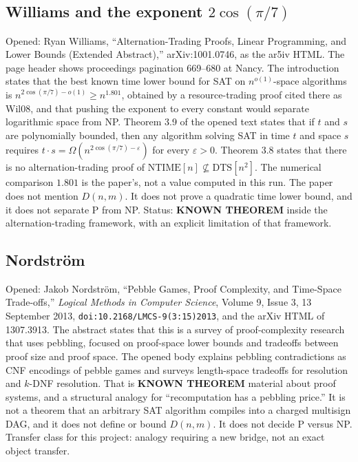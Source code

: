 \documentclass[11pt]{article}
\begin{document}
\subsection*{Williams and the exponent \(2\cos(\pi/7)\)}
Opened: Ryan Williams, ``Alternation-Trading Proofs, Linear Programming, and Lower Bounds (Extended Abstract),'' arXiv:1001.0746, as the ar5iv HTML.
The page header shows proceedings pagination 669--680 at Nancy.
The introduction states that the best known time lower bound for SAT on \(n^{o(1)}\)-space algorithms is \(n^{2\cos(\pi/7)-o(1)}\ge n^{1.801}\), obtained by a resource-trading proof cited there as Wil08, and that pushing the exponent to every constant would separate logarithmic space from NP.
Theorem 3.9 of the opened text states that if \(t\) and \(s\) are polynomially bounded, then any algorithm solving SAT in time \(t\) and space \(s\) requires \(t\cdot s=\Omega(n^{2\cos(\pi/7)-\varepsilon})\) for every \(\varepsilon>0\).
Theorem 3.8 states that there is no alternation-trading proof of \(\mathrm{NTIME}[n]\nsubseteq\mathrm{DTS}[n^2]\).
The numerical comparison \(1.801\) is the paper's, not a value computed in this run.
The paper does not mention \(D(n,m)\).
It does not prove a quadratic time lower bound, and it does not separate P from NP.
Status: \textbf{KNOWN THEOREM} inside the alternation-trading framework, with an explicit limitation of that framework.

\subsection*{Nordstr\"om}
Opened: Jakob Nordstr\"om, ``Pebble Games, Proof Complexity, and Time-Space Trade-offs,'' \emph{Logical Methods in Computer Science}, Volume 9, Issue 3, 13 September 2013, \texttt{doi:10.2168/LMCS-9(3:15)2013}, and the arXiv HTML of 1307.3913.
The abstract states that this is a survey of proof-complexity research that uses pebbling, focused on proof-space lower bounds and tradeoffs between proof size and proof space.
The opened body explains pebbling contradictions as CNF encodings of pebble games and surveys length-space tradeoffs for resolution and \(k\)-DNF resolution.
That is \textbf{KNOWN THEOREM} material about proof systems, and a structural analogy for ``recomputation has a pebbling price.''
It is not a theorem that an arbitrary SAT algorithm compiles into a charged multisign DAG, and it does not define or bound \(D(n,m)\).
It does not decide P versus NP.
Transfer class for this project: analogy requiring a new bridge, not an exact object transfer.
\end{document}
